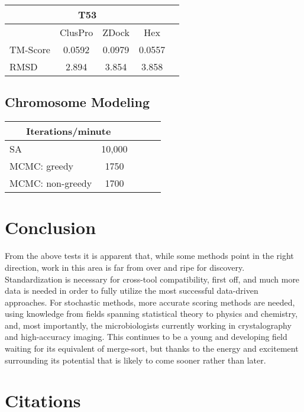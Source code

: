 \documentclass{article}
\begin{document}
\begin{center}
\begin{tabular}{|l|c|c|c|r|}
\multicolumn{4}{c}{T53} \\
    \hline
      & ClusPro & ZDock & Hex \\ \hline
    TM-Score & 0.0592 & 0.0979 & 0.0557 \\ \hline
    RMSD & 2.894 & 3.854 & 3.858 \\
    \hline
    \end{tabular}
\end{center}


\subsection{Chromosome Modeling}

\begin{center}
\begin{tabular}{|l|c|c|c|r|}
\multicolumn{2}{c}{Iterations/minute} \\
    \hline
    SA & 10,000 \\ \hline
    MCMC: greedy & 1750    \\ \hline
    MCMC: non-greedy & 1700    \\ \hline
    \end{tabular}
\end{center}


\section{Conclusion}

From the above tests it is apparent that, while some methods point in the right direction, work in this area is far from over and ripe for discovery. Standardization is necessary for cross-tool compatibility, first off, and much more data is needed in order to fully utilize the most successful data-driven approaches. For stochastic methods, more accurate scoring methods are needed, using knowledge from fields spanning statistical theory to physics and chemistry, and, most importantly, the microbiologists currently working in crystalography and high-accuracy imaging. This continues to be a young and developing field waiting for its equivalent of merge-sort, but thanks to the energy and excitement surrounding its potential that is likely to come sooner rather than later.


\section{Citations}
\end{document}
